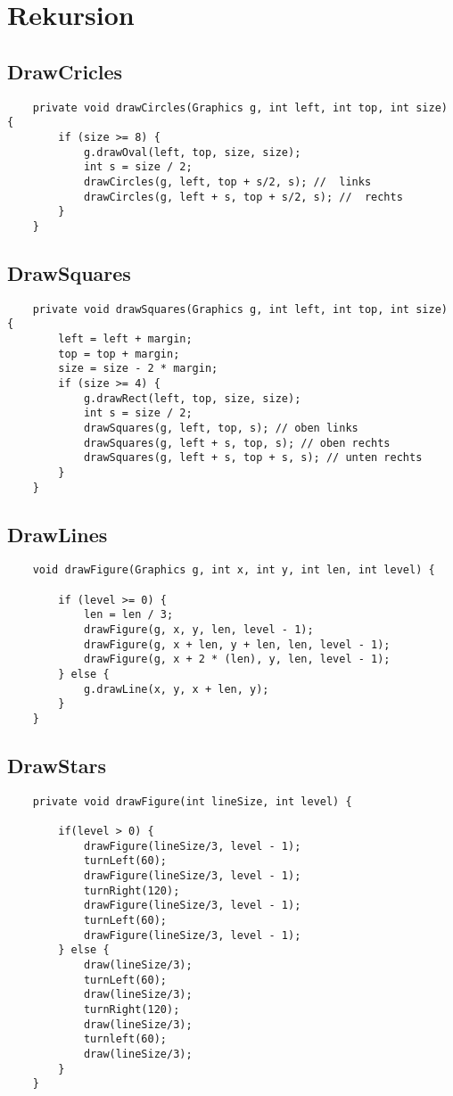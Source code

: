 \section*{Rekursion}
\subsection*{DrawCricles}
\begin{verbatim}
    private void drawCircles(Graphics g, int left, int top, int size) {
        if (size >= 8) {
            g.drawOval(left, top, size, size);
            int s = size / 2;
            drawCircles(g, left, top + s/2, s); //  links
            drawCircles(g, left + s, top + s/2, s); //  rechts
        }
    }
\end{verbatim}

\subsection*{DrawSquares}

\begin{verbatim}
    private void drawSquares(Graphics g, int left, int top, int size) {
        left = left + margin;
        top = top + margin;
        size = size - 2 * margin;
        if (size >= 4) {
            g.drawRect(left, top, size, size);
            int s = size / 2;
            drawSquares(g, left, top, s); // oben links
            drawSquares(g, left + s, top, s); // oben rechts
            drawSquares(g, left + s, top + s, s); // unten rechts
        }
    }

\end{verbatim}

\subsection*{DrawLines}
\begin{verbatim}    
    void drawFigure(Graphics g, int x, int y, int len, int level) {

        if (level >= 0) {
            len = len / 3;
            drawFigure(g, x, y, len, level - 1);
            drawFigure(g, x + len, y + len, len, level - 1);
            drawFigure(g, x + 2 * (len), y, len, level - 1);
        } else {
            g.drawLine(x, y, x + len, y);
        }
    }
\end{verbatim}

\subsection*{DrawStars}
\begin{verbatim}    
    private void drawFigure(int lineSize, int level) {
    
    	if(level > 0) {
    		drawFigure(lineSize/3, level - 1);
    		turnLeft(60);
    		drawFigure(lineSize/3, level - 1);
    		turnRight(120);
    		drawFigure(lineSize/3, level - 1);
    		turnLeft(60);
    		drawFigure(lineSize/3, level - 1);
    	} else {
    		draw(lineSize/3);
    		turnLeft(60);
    		draw(lineSize/3);
    		turnRight(120);
    		draw(lineSize/3);
    		turnleft(60);
    		draw(lineSize/3);
    	}
    }
\end{verbatim}


